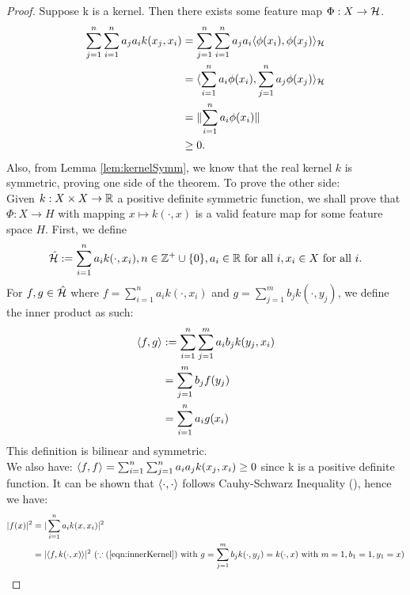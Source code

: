 \documentclass[twoside]{memoir}
\begin{document}
	\begin{proof}
		Suppose k is a kernel. Then there exists some feature map $\Phi: X \rightarrow \mathcal{H}$.
		\begin{equation*}
		\begin{split}
		\sum_{j=1}^{n} \sum_{i=1}^{n} a_j a_i k(x_j, x_i) &= 
		\sum_{j=1}^{n} \sum_{i=1}^{n} a_j a_i \langle\phi(x_i), \phi(x_j)\rangle_{\mathcal{H}} \\
		&= \langle\sum_{i=1}^{n} a_i \phi(x_i), \sum_{j=1}^{n} a_j \phi(x_j)\rangle_{\mathcal{H}} \\
		&= \lVert\sum_{i=1}^{n} a_i \phi(x_i)\rVert \\
		&\geq 0.
		\end{split}
		\end{equation*}
		Also, from Lemma \ref{lem:kernelSymm}, we know that the real kernel $k$ is symmetric, proving one side of the theorem. To prove the other side: \\
		Given $k:X \times X \rightarrow \mathbb{R}$ a positive definite symmetric function, we shall prove that $\Phi: X \rightarrow H$ with mapping $x \mapsto k(\cdot, x)$ is a valid feature map for some feature space $H$. First, we define
		\[ \hat{\mathcal{H}} := \sum_{i=1}^{n} a_i k(\cdot, x_i), n \in \mathbb{Z}^+ \cup \{0\}, a_i \in \mathbb{R} \text{ for all } i, x_i \in X \text{ for all } i. \]
		For $f, g \in \hat{\mathcal{H}}$ where $f = \sum_{i=1}^{n}a_i k(\cdot, x_i)$ and $g = \sum_{j=1}^{m}b_j k(\cdot, y_j)$, we define the inner product as such:\
		\begin{equation} \label{eqn:innerKernel}
		\begin{split}
		\langle f, g\rangle  &:= \sum_{i=1}^{n} \sum_{j=1}^{m} a_i b_j k(y_j, x_i) \\
		&= \sum_{j=1}^{m} b_j f(y_j) \\
		&= \sum_{i=1}^{n} a_ig(x_i) 
		\end{split}
		\end{equation}
		This definition is bilinear and symmetric. \\
		We also have: $\langle f, f\rangle = \sum_{i=1}^{n}\sum_{j=1}^{n}a_i a_j k(x_j, x_i) \geq 0 $ since k is a positive definite function. It can be shown that $\langle\cdot, \cdot\rangle$ follows Cauhy-Schwarz Inequality (\cite{steinwartSVM}), hence we have:
		\begin{equation*}
		\begin{split}
		|f(x)|^2 &= |\sum_{i=1}^{n}a_ik(x, x_i)|^2 \\
		&= |\inner{f, k(\cdot, x)}|^2 ~ (\because (\ref{eqn:innerKernel}) \text{ with } g = \sum_{j=1}^{m}b_j k(\cdot, y_j) = k(\cdot, x) \text{ with } m=1, b_1 = 1, y_1 = x)\\

\end{split}
\end{equation*}
\end{proof}
\end{document}
